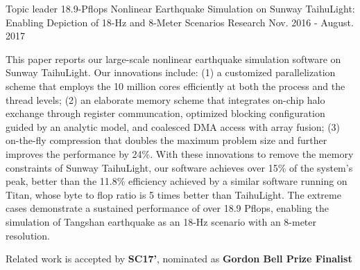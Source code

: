 \documentclass[11pt, a4paper]{awesome-cv}
\begin{document}
\begin{cventries}

  \cventry
    {Topic leader} %
    {18.9-Pflops Nonlinear Earthquake Simulation on Sunway TaihuLight: Enabling Depiction of 18-Hz and 8-Meter Scenarios} %
    {Research} %
    {Nov. 2016 - August. 2017} %
    {
      \begin{cvitems} %
        \item {This paper reports our large-scale nonlinear earthquake simulation software on Sunway TaihuLight. Our innovations include: (1) a customized parallelization scheme that employs the 10 million cores efficiently at both the process and the thread levels; (2) an elaborate memory scheme that integrates on-chip halo exchange through register communcation, optimized blocking configuration guided by an analytic model, and coalesced DMA access with array fusion; (3) on-the-fly compression that doubles the maximum problem size and further improves the performance by 24\%. With these innovations to remove the memory constraints of Sunway TaihuLight, our software achieves over 15\% of the system's peak, better than the 11.8\% efficiency achieved by a similar software running on Titan, whose byte to flop ratio is 5 times better than TaihuLight. The extreme cases demonstrate a sustained performance of over 18.9 Pflops, enabling the simulation of Tangshan earthquake as an 18-Hz scenario with an 8-meter resolution.}
       \item {Related work is accepted by \textbf{SC17'}, nominated as \textbf{Gordon Bell Prize Finalist}}
      \end{cvitems}
    }
      

\end{cventries}
\end{document}
